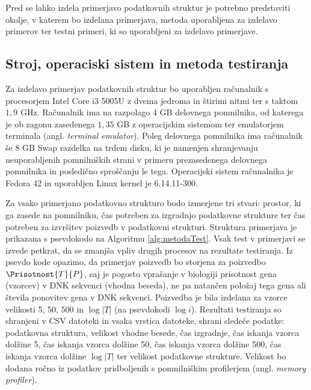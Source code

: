 Pred se lahko izdela primerjavo podatkovnih struktur je potrebno predstaviti okolje, v katerem bo izdelana primerjava, metoda uporabljena za izdelavo primerov ter testni primeri, ki so uporabljeni za izdelavo primerjave.

\subsection{Stroj, operaciski sistem in metoda testiranja}
Za izdelavo primerjav podatkovnih struktur bo uporabljen računalnik s procesorjem Intel Core i3 5005U z dvema jedroma in štirimi nitmi ter s taktom $1,9$ GHz. Računalnik ima na razpolago 4 GB delovnega pomnilnika, od katerega je ob zagonu zasedenega $1,35$ GB z operacijskim sistemom ter emulatorjem terminala (angl. \textit{terminal emulator}). Poleg delovnega pomnilnika ima računalnik še $8$ GB Swap razdelka na trdem disku, ki je namenjen shranjevanju neuporabljenih pomnilniških strani v primeru prezasedenega delovnega pomnilnika in posledično sproščanju le tega. Operacijski sistem računalnika je Fedora 42 in uporabljen Linux kernel je 6.14.11-300.

Za vsako primerjano podatkovno strukturo bodo izmerjene tri stvari: prostor, ki ga zasede na pomnilniku, čas potreben za izgradnjo podatkovne strukture ter čas potreben za izvršitev poizvedb v podatkovni strukturi. Struktura primerjava je prikazana s psevdokodo na Algoritmu \ref{alg:metodaTest}. Vsak test v primerjavi se izvede petkrat, da se zmanjša vpliv drugih procesov na rezultate testiranja. Iz psevdo kode opazimo, da primerjav poizvedb bo storjena za poizvedbo $\Prisotnost{T}{P}$, saj je pogosto vprašanje v biologiji prisotnost gena (vzorcev) v DNK sekvenci (vhodna beseda), ne pa natančen položaj tega gena ali števila ponovitev gena v DNK sekvenci. Poizvedba je bila izdelana za vzorce velikosti 5, 50, 500 in $\log{|T|}$ (na psevdokodi $\log{i}$). Rezultati testiranja so shranjeni v CSV datoteki in vsaka vrstica datoteke, shrani sledeče podatke: podatkovna struktura, velikost vhodne besede, čas izgradnje, čas iskanja vzorca dolžine 5, čas iskanja vzorca dolžine 50, čas iskanja vzorca dolžine 500, čas iskanja vzorca dolžine $\log{|T|}$ ter velikost podatkovne strukture. Velikost bo dodana ročno iz podatkov pridboljenih s pomnilniškim profilerjem (angl. \textit{memory profiler}). 

